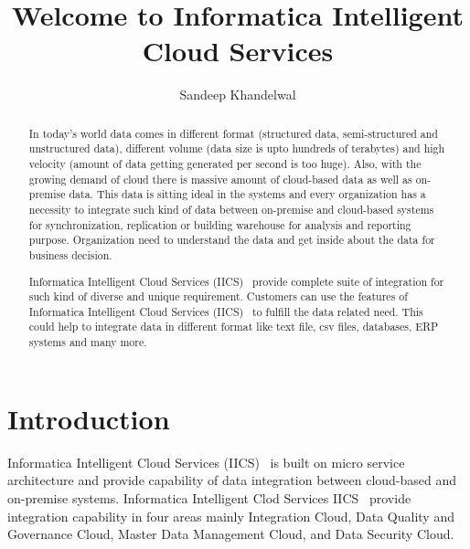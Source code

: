 \title{Welcome to Informatica Intelligent Cloud Services}

\author{Sandeep Khandelwal}

\renewcommand{\shortauthors}{S. Khandelwal}

\begin{abstract}
	
In today's world data comes in different format (structured data,
semi-structured and unstructured data), different volume (data size is upto
hundreds of terabytes) and high velocity (amount of data getting
generated per second is too huge). Also, with the growing demand of cloud there is massive amount of
cloud-based data as well as on-premise data. This data is sitting ideal in the systems and every organization has a necessity to integrate such kind of data between on-premise and cloud-based
systems for synchronization, replication or building warehouse for
analysis and reporting purpose. Organization need to understand the data and get inside about the data for business decision. 

Informatica Intelligent Cloud Services
(IICS)~\cite{hid-sp18-511-iics} provide complete suite of integration
for such kind of diverse and unique requirement. Customers can use the features of Informatica Intelligent Cloud Services (IICS)~\cite{hid-sp18-511-iics} to fulfill the data related need. This could help to integrate data in different format like text file, csv files, databases, ERP systems and many more.

\end{abstract}



\maketitle


\section{Introduction}

Informatica Intelligent Cloud Services (IICS)~\cite{hid-sp18-511-iics} is built on micro service
architecture and provide capability of data integration between
cloud-based and on-premise systems. Informatica Intelligent Clod
Services IICS~\cite{hid-sp18-511-iics} provide integration capability
in four areas mainly Integration Cloud, Data Quality and Governance
Cloud, Master Data Management Cloud, and Data Security Cloud.

